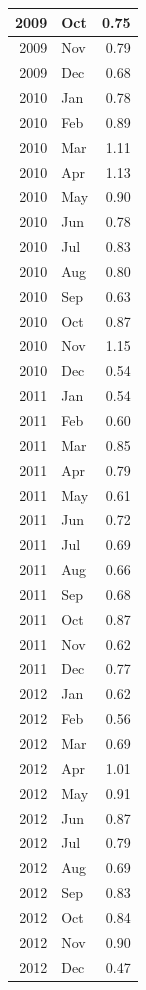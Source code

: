 \documentclass[
]{article}
\begin{document}
\begin{table}[H]
\begin{tabular}[t]{r|l|r}
\hline
2009 & Oct & 0.75\\
\hline
2009 & Nov & 0.79\\
\hline
2009 & Dec & 0.68\\
\hline
2010 & Jan & 0.78\\
\hline
2010 & Feb & 0.89\\
\hline
2010 & Mar & 1.11\\
\hline
2010 & Apr & 1.13\\
\hline
2010 & May & 0.90\\
\hline
2010 & Jun & 0.78\\
\hline
2010 & Jul & 0.83\\
\hline
2010 & Aug & 0.80\\
\hline
2010 & Sep & 0.63\\
\hline
2010 & Oct & 0.87\\
\hline
2010 & Nov & 1.15\\
\hline
2010 & Dec & 0.54\\
\hline
2011 & Jan & 0.54\\
\hline
2011 & Feb & 0.60\\
\hline
2011 & Mar & 0.85\\
\hline
2011 & Apr & 0.79\\
\hline
2011 & May & 0.61\\
\hline
2011 & Jun & 0.72\\
\hline
2011 & Jul & 0.69\\
\hline
2011 & Aug & 0.66\\
\hline
2011 & Sep & 0.68\\
\hline
2011 & Oct & 0.87\\
\hline
2011 & Nov & 0.62\\
\hline
2011 & Dec & 0.77\\
\hline
2012 & Jan & 0.62\\
\hline
2012 & Feb & 0.56\\
\hline
2012 & Mar & 0.69\\
\hline
2012 & Apr & 1.01\\
\hline
2012 & May & 0.91\\
\hline
2012 & Jun & 0.87\\
\hline
2012 & Jul & 0.79\\
\hline
2012 & Aug & 0.69\\
\hline
2012 & Sep & 0.83\\
\hline
2012 & Oct & 0.84\\
\hline
2012 & Nov & 0.90\\
\hline
2012 & Dec & 0.47\\

\end{tabular}
\end{table}
\end{document}
